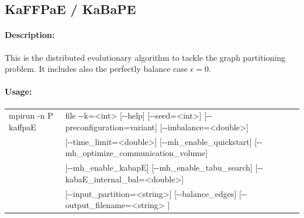 \documentclass[11pt]{article}
\begin{document}
\subsection{KaFFPaE / KaBaPE}
\paragraph*{Description:} This is the distributed evolutionary algorithm to tackle the graph partitioning problem. It includes also the perfectly balance case $\epsilon=0$.
\paragraph*{Usage:\\} 
\begin{tabular}{ll}
mpirun -n P kaffpaE & file -{}-k=<int> [-{}-help] [-{}-seed=<int>]  [-{}-preconfiguration=variant] [-{}-imbalance=<double>] \\
                    & [-{}-time\_limit=<double>] [-{}-mh\_enable\_quickstart] [-{}-mh\_optimize\_communication\_volume]\\
                    & [-{}-mh\_enable\_kabapE] [-{}-mh\_enable\_tabu\_search] [-{}-kabaE\_internal\_bal=<double>]\\ 
                    & [-{}-input\_partition=<string>] [-{}-balance\_edges] [-{}-output\_filename=<string> ]
\end{tabular}
\end{document}
